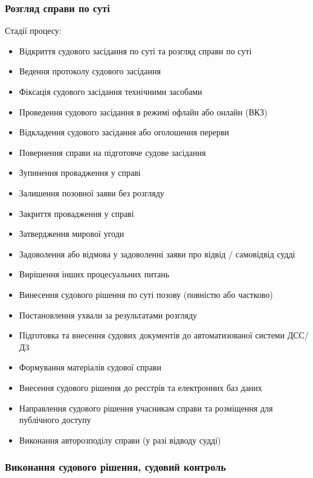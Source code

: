 \documentclass{article}
\begin{document}
\newpage
\subsubsection{Розгляд справи по суті}

Стадії процесу:

\begin{itemize}
    \item Відкриття судового засідання по суті та розгляд справи по суті
    \item Ведення протоколу судового засідання
    \item Фіксація судового засідання технічними засобами
    \item Проведення судового засідання в режимі офлайн або онлайн (ВКЗ)
    \item Відкладення судового засідання або оголошення перерви
    \item Повернення справи на підготовче судове засідання
    \item Зупинення провадження у справі
    \item Залишення позовної заяви без розгляду
    \item Закриття провадження у справі
    \item Затвердження мирової угоди
    \item Задоволення або відмова у задоволенні заяви про відвід / самовідвід судді
    \item Вирішення інших процесуальних питань
    \item Винесення судового рішення по суті позову (повністю або частково)
    \item Постановлення ухвали за результатами розгляду
    \item Підготовка та внесення судових документів до автоматизованої системи ДСС/Д3
    \item Формування матеріалів судової справи
    \item Внесення судового рішення до реєстрів та електронних баз даних
    \item Направлення судового рішення учасникам справи та розміщення для публічного доступу
    \item Виконання авторозподілу справи (у разі відводу судді)
\end{itemize}

\newpage
\subsubsection{Виконання судового рішення, судовий контроль}
\end{document}
